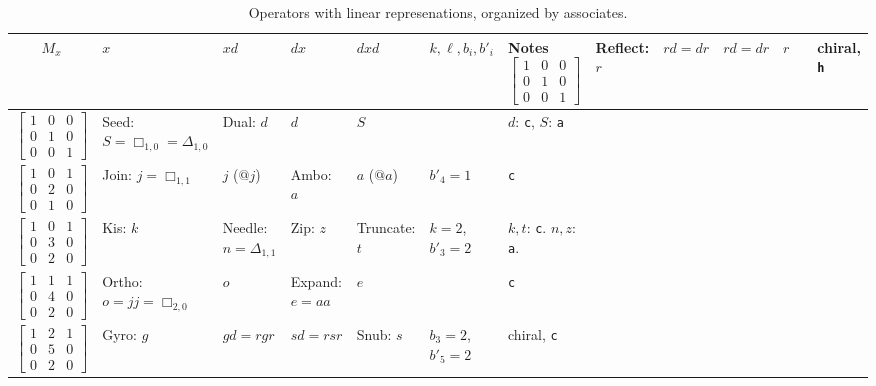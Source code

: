 \documentclass{amsart}[12pt]
\begin{document}
\begin{longtable}{c|m{2cm}|m{2cm}|m{2cm}|m{2cm}|m{1.7cm}|m{2.5cm}}
    \caption{Operators with linear represenations, organized by associates.}
    \\
    $M_x$ & $x$ & $xd$ & $dx$ & $dxd$ & $k, \ell, b_i, b'_i$ & Notes
    \endhead \hline
    $\begin{bmatrix}
    1 & 0 & 0 \\
    0 & 1 & 0 \\
    0 & 0 & 1 \end{bmatrix}$& Reflect: $r$ & $rd=dr$ & $rd=dr$ & $r$ & & chiral, \texttt{h}
    \\ \hline
    $\begin{bmatrix}
    1 & 0 & 0 \\
    0 & 1 & 0 \\
    0 & 0 & 1 \end{bmatrix}$& Seed: $S=\Box_{1,0} =\Delta_{1,0}$ & Dual: $d$ & $d$ & $S$ & & $d$: \texttt{c}, $S$: \texttt{a}
    \\ \hline
    $\begin{bmatrix}
    1 & 0 & 1 \\
    0 & 2 & 0 \\
    0 & 1 & 0 \end{bmatrix}$& Join: ${j=\Box_{1,1}}$ & $j$ ($@j$) & Ambo: $a$ & $a$ ($@a$)& $b'_4=1$ &\texttt{c}
    \\ \hline
    $\begin{bmatrix}
    1 & 0 & 1 \\
    0 & 3 & 0 \\
    0 & 2 & 0 \end{bmatrix}$& Kis: $k$ & Needle: $n =\Delta_{1,1}$ & Zip: $z$ & Truncate: $t$ & ${k=2}$, ${b'_3=2}$ &$k, t$: \texttt{c}. $n, z$: \texttt{a}.
    \\ \hline
    $\begin{bmatrix}
    1 & 1 & 1 \\
    0 & 4 & 0 \\
    0 & 2 & 0 \end{bmatrix}$& Ortho: ${o=jj=\Box_{2,0}}$ & $o$ & Expand: ${e=aa}$ & $e$ & &\texttt{c}
    \\ \hline
    $\begin{bmatrix}
    1 & 2 & 1 \\
    0 & 5 & 0 \\
    0 & 2 & 0 \end{bmatrix}$& Gyro: $g$ & $gd=rgr$ & $sd=rsr$ & Snub: $s$ & ${b_3=2}$, ${b'_5=2}$ &chiral, \texttt{c}
    \\ \hline

\end{longtable}
\end{document}
